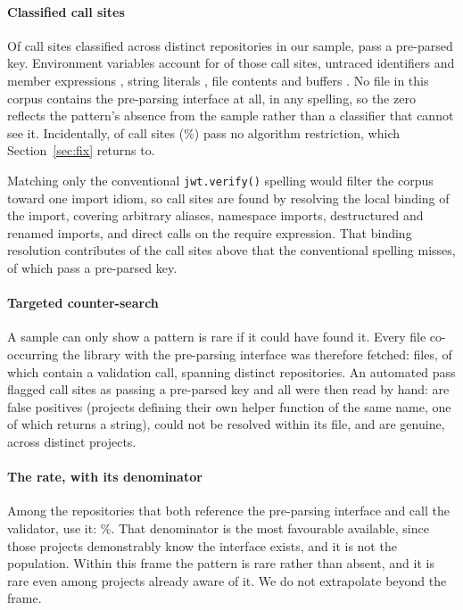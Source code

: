 \documentclass[preprint,12pt,authoryear]{elsarticle}
\begin{document}
\paragraph{Classified call sites} Of \SampleCallSites{} call sites classified
across \SampleRepos{} distinct repositories in our sample,
\SampleSitesPreparsed{} pass a pre-parsed key. Environment variables account for
\SampleEnvString{} of those call sites, untraced identifiers and member
expressions \SampleUnknown{}, string literals \SampleStringLiteral{}, file
contents \SampleFileContents{} and buffers \SampleBuffer. No file in this corpus
contains the pre-parsing interface at all, in any spelling, so the zero reflects
the pattern's absence from the sample rather than a classifier that cannot see
it. Incidentally, \SampleNoAlgorithms{} of \SampleCallSites{} call sites
(\SampleNoAlgorithmsPct\%) pass no algorithm restriction, which
Section~\ref{sec:fix} returns to.

Matching only the conventional \texttt{jwt.verify()} spelling would filter the
corpus toward one import idiom, so call sites are found by resolving the local
binding of the import, covering arbitrary aliases, namespace imports,
destructured and renamed imports, and direct calls on the require expression.
That binding resolution contributes \SampleRematchAdded{} of the call sites
above that the conventional spelling misses, of which \RematchSitesPreparsed{}
pass a pre-parsed key.

\paragraph{Targeted counter-search} A sample can only show a pattern is rare if
it could have found it. Every file co-occurring the library with the pre-parsing
interface was therefore fetched: \CounterFilesFetched{} files, of which
\CounterWithVerify{} contain a validation call, spanning
\CounterReposWithVerify{} distinct repositories. An automated pass flagged
\AdjudicatedTotal{} call sites as passing a pre-parsed key and all were then read
by hand: \AdjudicatedFalsePositive{} are false positives (projects defining
their own helper function of the same name, one of which returns a string),
\AdjudicatedUnresolved{} could not be resolved within its file, and
\AdjudicatedGenuine{} are genuine, across \AdjudicatedGenuineProjects{} distinct
projects.

\paragraph{The rate, with its denominator} Among the \CounterReposWithVerify{}
repositories that both reference the pre-parsing interface and call the
validator, \AdjudicatedGenuineProjects{} use it: \AdjudicatedGenuinePct\%. That
denominator is the most favourable available, since those projects demonstrably
know the interface exists, and it is not the population. Within this frame the
pattern is rare rather than absent, and it is rare even among projects already
aware of it. We do not extrapolate beyond the frame.
\end{document}

